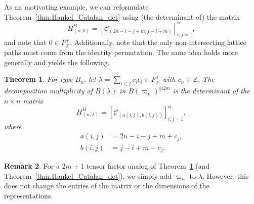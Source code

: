 \documentclass[11pt, leqno]{amsart}
\theoremstyle{plain}
\newtheorem{theorem}{Theorem}[section]
\theoremstyle{definition}
\newtheorem{remark}[theorem]{Remark}
\numberwithin{equation}{section}
\newcommand{\fw}{\varpi} %
\newcommand{\Cat}{\mathcal{C}} %
\newcommand{\Z}{\mathbb{Z}}
\begin{document}
As an motivating example, we can reformulate Theorem~\ref{thm:Hankel_Catalan_det} using (the determinant of) the matrix
\[
H^B_{(n,0)} =\left[ \Cat_{(2n-i-j+m, j-i+m)} \right]_{i,j=1}^n,
\]
and note that $0 \in P_{\Z}^+$.
Additionally, note that the only non-intersecting lattice paths must come from the identity permutation. The same idea holds more generally and yields the following.

\begin{theorem}
\label{thm:triangular_Catalan_det}
For type $B_n$, let $\lambda = \sum_{i \in I} c_i \epsilon_i \in P_{\Z}^+$ with $c_n \in \Z$.
The decomposition multiplicity of $B(\lambda)$ in $B(\fw_n)^{\otimes 2m}$ is the determinant of the $n \times n$ matrix
\[
H^B_{(n,\lambda)} = \left[ \Cat_{(a(i,j),b(i,j))} \right]_{i,j=1}^n,
\]
where
\begin{align*}
a(i,j) & = 2n - i - j + m + c_j,
\\ b(i,j) & = j - i + m - c_j.
\end{align*}
\end{theorem}


\begin{remark}
For a $2m+1$ tensor factor analog of Theorem~\ref{thm:triangular_Catalan_det} (and Theorem~\ref{thm:Hankel_Catalan_det}), we simply add $\fw_n$ to $\lambda$. However, this does not change the entries of the matrix or the dimensions of the representations.
\end{remark}
\end{document}
